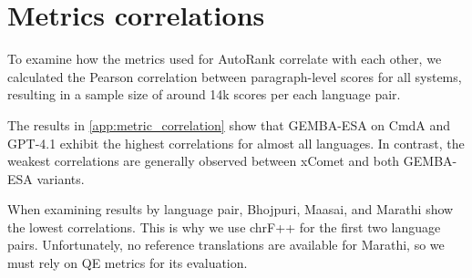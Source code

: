 \documentclass[11pt]{article}
\begin{document}


\clearpage




\appendix
\onecolumn

\section{Metrics correlations}

To examine how the metrics used for AutoRank correlate with each other, we calculated the Pearson correlation between paragraph-level scores for all systems, resulting in a sample size of around 14k scores per each language pair.

The results in \cref{app:metric_correlation} show that GEMBA-ESA on CmdA and GPT-4.1 exhibit the highest correlations for almost all languages. In contrast, the weakest correlations are generally observed between xComet and both GEMBA-ESA variants.

When examining results by language pair, Bhojpuri, Maasai, and Marathi show the lowest correlations. This is why we use chrF++ for the first two language pairs. Unfortunately, no reference translations are available for Marathi, so we must rely on QE metrics for its evaluation.

\begin{table*}[h]
\small

\label{app:metric_correlation}
\end{table*}
\end{document}

